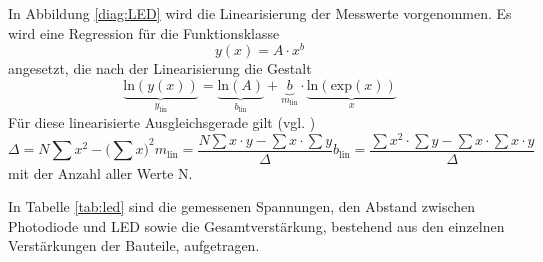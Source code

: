 In Abbildung \ref{diag:LED} wird die Linearisierung der Messwerte vorgenommen.
Es wird eine Regression für die Funktionsklasse 
\begin{equation}
	y(x)=A\cdot x^b
\end{equation}
angesetzt, die nach der Linearisierung die Gestalt
\begin{equation}
	\underbrace{\text{ln}(y(x))}_{y_\text{lin}}=\underbrace{\text{ln}(A)}_{b_\text{lin}}+\underbrace{b}_{m_\text{lin}}\cdot \underbrace{\text{ln}(\text{exp}(x))}_{x}
\end{equation}
Für diese linearisierte Ausgleichsgerade gilt (vgl. \cite{scipy})
\begin{subequations}
	\begin{equation}
		\Delta = N \sum{x^2} - {\bigl(\sum{x}\bigr)}^2
	\end{equation}
	\begin{equation}
		m_{\text{lin}} = \frac{N\sum{x\cdot y} - \sum{x} \cdot \sum{y}}{\Delta}
	\end{equation}
    \begin{equation}
		b_{\text{lin}} = \frac{\sum{x^2} \cdot \sum{y} - \sum{x} \cdot \sum{x \cdot y}}{\Delta}
	\end{equation}
\end{subequations}
mit der Anzahl aller Werte N.

In Tabelle \ref{tab:led} sind die gemessenen Spannungen, den Abstand zwischen Photodiode und LED sowie die Gesamtverstärkung, bestehend aus den einzelnen Verstärkungen der Bauteile, aufgetragen.

